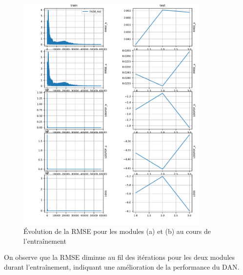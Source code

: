 \documentclass[12pt,a4paper]{article}
\begin{document}
\begin{figure}[H]
    \centering
    \includegraphics[width=0.85\textwidth]{src/rmse.pdf}
    \caption{Évolution de la RMSE pour les modules (a) et (b) au cours de l'entraînement}
    \label{fig:rmse}
\end{figure}

On observe que la RMSE diminue au fil des itérations pour les deux modules durant l'entraînement, indiquant une amélioration de la performance du DAN. \\
\end{document}
